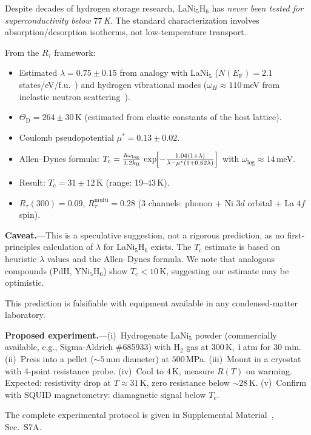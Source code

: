 \documentclass[prb,twocolumn,superscriptaddress,longbibliography,floatfix]{revtex4-2}
\newcommand{\kB}{k_{\mathrm{B}}}
\newcommand{\tauasym}{\tau}
\newcommand{\Rtau}{R_{\tauasym}}
\newcommand{\Tc}{T_{\mathrm{c}}}
\newcommand{\EF}{E_{\mathrm{F}}}
\newcommand{\ThetaD}{\Theta_{\mathrm{D}}}
\begin{document}
Despite decades of hydrogen storage research, LaNi$_5$H$_6$
has \emph{never been tested for superconductivity below $77\,$K}.
The standard characterization involves absorption/desorption
isotherms, not low-temperature transport.

From the $\Rtau$ framework:
\begin{itemize}
\item Estimated $\lambda = 0.75 \pm 0.15$ from analogy with
  LaNi$_5$ ($N(\EF) = 2.1\,$states/eV/f.u.~\cite{Gupta1987})
  and hydrogen vibrational modes ($\omega_H \approx 110\,$meV
  from inelastic neutron scattering~\cite{Richter1981}).
\item $\ThetaD = 264 \pm 30\,$K (estimated from elastic constants
  of the host lattice).
\item Coulomb pseudopotential $\mu^* = 0.13 \pm 0.02$.
\item Allen--Dynes formula:
  $\Tc = \frac{\hbar\omega_{\log}}{1.2\kB}\,
  \exp\!\Bigl[-\frac{1.04(1+\lambda)}{\lambda - \mu^*(1+0.62\lambda)}\Bigr]$
  with $\omega_{\log} \approx 14\,$meV.
\item Result: $\Tc = 31 \pm 12\,$K (range: 19--43\,K).
\item $\Rtau(300) = 0.09$, $\Rtau^{\mathrm{multi}} = 0.28$
  (3 channels: phonon + Ni $3d$ orbital + La $4f$ spin).
\end{itemize}

\textbf{Caveat.}---This is a speculative suggestion, not a
rigorous prediction, as no first-principles calculation of
$\lambda$ for LaNi$_5$H$_6$ exists.  The $\Tc$ estimate is
based on heuristic $\lambda$ values and the Allen--Dynes formula.
We note that analogous compounds (PdH, YNi$_5$H$_6$) show
$\Tc < 10\,$K, suggesting our estimate may be optimistic.

This prediction is falsifiable with equipment available in any
condensed-matter laboratory.

\textbf{Proposed experiment.}---(i)~Hydrogenate LaNi$_5$ powder
(commercially available, e.g., Sigma-Aldrich \#685933) with
$\mathrm{H}_2$ gas at $300\,$K, $1\,$atm for 30 min.
(ii)~Press into a pellet ($\sim 5\,$mm diameter) at
$500\,$MPa.  (iii)~Mount in a cryostat with 4-point resistance
probe.  (iv)~Cool to $4\,$K, measure $R(T)$ on warming.
Expected: resistivity drop at $T \approx 31\,$K, zero resistance
below $\sim 28\,$K.  (v)~Confirm with SQUID magnetometry:
diamagnetic signal below $\Tc$.

The complete experimental protocol is given in Supplemental
Material~\cite{supplement}, Sec.~S7A.
\end{document}
